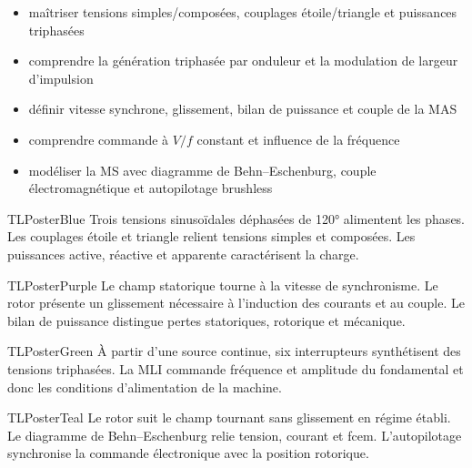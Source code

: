 \documentclass[10pt,a3paper]{article}
\begin{document}
\vspace{2mm}
\begin{minipage}[t]{0.61\linewidth}
\begin{TLPosterSavoirs}
\begin{itemize}
  \item maîtriser tensions simples/composées, couplages étoile/triangle et puissances triphasées
  \item comprendre la génération triphasée par onduleur et la modulation de largeur d'impulsion
  \item définir vitesse synchrone, glissement, bilan de puissance et couple de la MAS
  \item comprendre commande à $V/f$ constant et influence de la fréquence
  \item modéliser la MS avec diagramme de Behn--Eschenburg, couple électromagnétique et autopilotage brushless
\end{itemize}
\end{TLPosterSavoirs}
\end{minipage}\hfill
\begin{minipage}[t]{0.36\linewidth}
\end{minipage}
\vfill
\begin{minipage}[t]{0.49\linewidth}
\begin{TLPosterBloc}{TLPosterBlue}
Trois tensions sinusoïdales déphasées de 120° alimentent les phases. Les couplages étoile et triangle relient tensions simples et composées. Les puissances active, réactive et apparente caractérisent la charge.
\end{TLPosterBloc}
\begin{TLPosterBloc}{TLPosterPurple}
Le champ statorique tourne à la vitesse de synchronisme. Le rotor présente un glissement nécessaire à l'induction des courants et au couple. Le bilan de puissance distingue pertes statoriques, rotorique et mécanique.
\end{TLPosterBloc}
\end{minipage}\hfill
\begin{minipage}[t]{0.49\linewidth}
\begin{TLPosterBloc}{TLPosterGreen}
À partir d'une source continue, six interrupteurs synthétisent des tensions triphasées. La MLI commande fréquence et amplitude du fondamental et donc les conditions d'alimentation de la machine.
\end{TLPosterBloc}
\begin{TLPosterBloc}{TLPosterTeal}
Le rotor suit le champ tournant sans glissement en régime établi. Le diagramme de Behn--Eschenburg relie tension, courant et fcem. L'autopilotage synchronise la commande électronique avec la position rotorique.
\end{TLPosterBloc}
\end{minipage}
\end{document}
